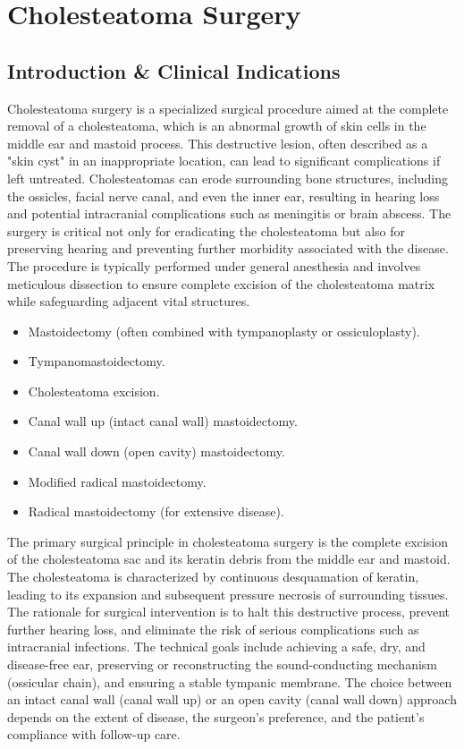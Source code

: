 \chapter{Cholesteatoma Surgery}

\section*{Introduction \& Clinical Indications}
Cholesteatoma surgery is a specialized surgical procedure aimed at the complete removal of a cholesteatoma, which is an abnormal growth of skin cells in the middle ear and mastoid process. This destructive lesion, often described as a "skin cyst" in an inappropriate location, can lead to significant complications if left untreated. Cholesteatomas can erode surrounding bone structures, including the ossicles, facial nerve canal, and even the inner ear, resulting in hearing loss and potential intracranial complications such as meningitis or brain abscess. The surgery is critical not only for eradicating the cholesteatoma but also for preserving hearing and preventing further morbidity associated with the disease. The procedure is typically performed under general anesthesia and involves meticulous dissection to ensure complete excision of the cholesteatoma matrix while safeguarding adjacent vital structures.

\begin{itemize}
  \item Mastoidectomy (often combined with tympanoplasty or ossiculoplasty).
  \item Tympanomastoidectomy.
  \item Cholesteatoma excision.
  \item Canal wall up (intact canal wall) mastoidectomy.
  \item Canal wall down (open cavity) mastoidectomy.
  \item Modified radical mastoidectomy.
  \item Radical mastoidectomy (for extensive disease).
\end{itemize}

The primary surgical principle in cholesteatoma surgery is the complete excision of the cholesteatoma sac and its keratin debris from the middle ear and mastoid. The cholesteatoma is characterized by continuous desquamation of keratin, leading to its expansion and subsequent pressure necrosis of surrounding tissues. The rationale for surgical intervention is to halt this destructive process, prevent further hearing loss, and eliminate the risk of serious complications such as intracranial infections. The technical goals include achieving a safe, dry, and disease-free ear, preserving or reconstructing the sound-conducting mechanism (ossicular chain), and ensuring a stable tympanic membrane. The choice between an intact canal wall (canal wall up) or an open cavity (canal wall down) approach depends on the extent of disease, the surgeon's preference, and the patient's compliance with follow-up care.

